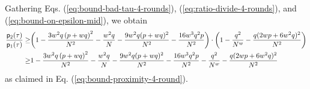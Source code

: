 Gathering Eqs. (\ref{eq:bound-bad-tau-4-rounds}), (\ref{eq:ratio-divide-4-rounds}), and (\ref{eq:bound-on-epsilon-mid}), we obtain
%
\begin{align*}
\frac{\mathsf{p}_{2}(\tau)}{\mathsf{p}_{1}(\tau)}   \geq   & \bigg(1-\frac{3w^{2} q \left(p+w q\right)^{2}}{N^{2}} - \frac{w^{2} q}{N} - \frac{9w^2 q (p+w q)^{2}}{N^2}- \frac{16w^3q^2p}{N^2}\bigg)\cdot\bigg(1-\frac{q^2}{N^w}-\frac{q(2wp+6w^2q)^2}{N^2}\bigg)     \notag      \\
\geq  &  1-\frac{3w^{2} q \left(p+w q\right)^{2}}{N^{2}} - \frac{w^{2} q}{N} - \frac{9w^2 q (p+w q)^{2}}{N^2}- \frac{16w^3q^2p}{N^2}-\frac{q^2}{N^w}-\frac{q(2wp+6w^2q)^2}{N^2}     \notag   
\end{align*}
%
as claimed in Eq. (\ref{eq:bound-proximity-4-round}).
